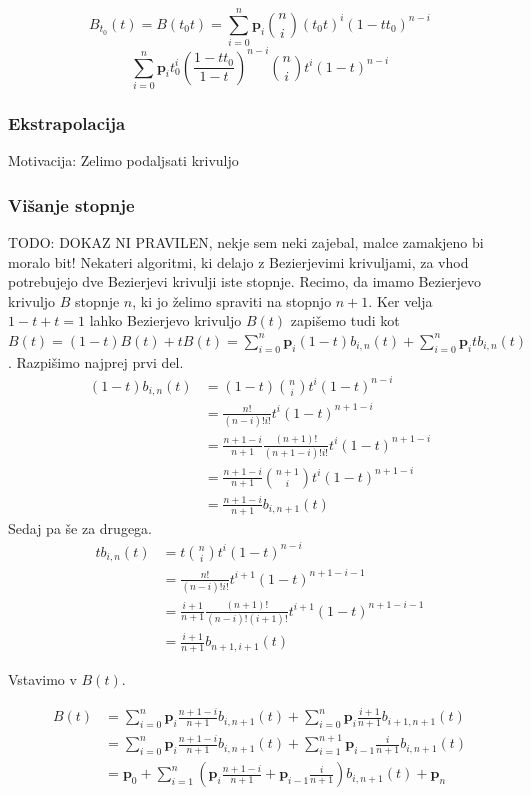 \documentclass[isrm2, tisk]{fmfdelo}
\newcommand{\lilb}[2]{b_{#1,#2}(t)}
\begin{document}
    \[B_{t_0}(t) = B(t_{0}t) = \sum_{i=0}^{n}\mathbf{p}_{i}\binom{n}{i}(t_{0}t)^i(1-tt_0)^{n-i} \]
    \[ \sum_{i=0}^{n}\mathbf{p}_{i}t_0^{i}\left(\frac{1-tt_0}{1-t}\right)^{n-i}\binom{n}{i}t^i(1-t)^{n-i} \]

    \subsubsection{Ekstrapolacija}
    Motivacija: Zelimo podaljsati krivuljo

    \subsubsection{Višanje stopnje}
    TODO: DOKAZ NI PRAVILEN, nekje sem neki zajebal, malce zamakjeno bi moralo bit!
    Nekateri algoritmi, ki delajo z Bezierjevimi krivuljami, za vhod potrebujejo dve Bezierjevi krivulji iste stopnje.
    Recimo, da imamo Bezierjevo krivuljo $B$ stopnje $n$, ki jo želimo spraviti na stopnjo $n+1$.
    Ker velja $1-t+t=1$ lahko Bezierjevo krivuljo $B(t)$ zapišemo tudi kot $B(t) = (1-t)B(t)+tB(t) = \sum_{i=0}^{n}\mathbf{p}_{i}(1-t)\lilb{i}{n} +\sum_{i=0}^{n}\mathbf{p}_{i}t\lilb{i}{n} $.
    Razpišimo najprej prvi del.
    \begin{align*}
    (1-t)
        \lilb{i}{n} &= (1-t)\binom{n}{i}t^i(1-t)^{n-i} \\
        &= \frac{n!}{(n-i)!i!}t^i(1-t)^{n+1-i} \\
        &=\frac{n+1-i}{n+1}\frac{(n+1)!}{(n+1-i)!i!}t^i(1-t)^{n+1-i}\\
        &=\frac{n+1-i}{n+1} \binom{n+1}{i}t^i(1-t)^{n+1-i} \\
        &=\frac{n+1-i}{n+1}\lilb{i}{n+1}
    \end{align*}
    Sedaj pa še za drugega.
    \begin{align*}
        t\lilb{i}{n} &= t\binom{n}{i}t^i(1-t)^{n-i} \\
        &= \frac{n!}{(n-i)!i!}t^{i+1}(1-t)^{n+1-i-1} \\
        &= \frac{i+1}{n+1}\frac{(n+1)!}{(n-i)!(i+1)!}t^{i+1}(1-t)^{n+1-i-1} \\
        &= \frac{i+1}{n+1}\lilb{n+1}{i+1}
    \end{align*}

    Vstavimo v $B(t)$.

    \begin{align*}
        B(t) &= \sum_{i=0}^{n}\mathbf{p}_{i}\frac{n+1-i}{n+1}\lilb{i}{n+1} +\sum_{i=0}^{n}\mathbf{p}_{i}\frac{i+1}{n+1}\lilb{i+1}{n+1}\\
        &= \sum_{i=0}^{n}\mathbf{p}_{i}\frac{n+1-i}{n+1}\lilb{i}{n+1} +\sum_{i=1}^{n+1}\mathbf{p}_{i-1}\frac{i}{n+1}\lilb{i}{n+1} \\
        &=\mathbf{p}_{0} + \sum_{i=1}^{n}\left(\mathbf{p}_{i}\frac{n+1-i}{n+1} + \mathbf{p}_{i-1}\frac{i}{n+1}\right)\lilb{i}{n+1}+\mathbf{p}_{n}
    \end{align*}
\end{document}
